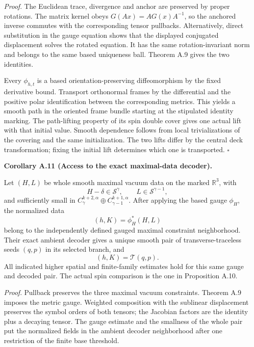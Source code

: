 \documentclass[
  english,
  11pt,
  reqno]{amsart}
\makeatletter
\newcommand{\pandocstatementheading}[1]{%
  \par\if@nobreak\else
    \addpenalty{\@beginparpenalty}%
    \addvspace{.5\baselineskip plus .2\baselineskip minus .2\baselineskip}%
  \fi
  {\normalfont\bfseries #1\par}%
  \nobreak\@afterindenttrue\@afterheading
}
\makeatother
\begin{document}
\emph{Proof.} The Euclidean trace, divergence and anchor are preserved
by proper rotations. The matrix kernel obeys \(G(Ax)=AG(x)A^{-1}\), so
the anchored inverse commutes with the corresponding tensor pullbacks.
Alternatively, direct substitution in the gauge equation shows that the
displayed conjugated displacement solves the rotated equation. It has
the same rotation-invariant norm and belongs to the same based
uniqueness ball. Theorem A.9 gives the two identities.

Every \(\phi_{h,t}\) is a based orientation-preserving diffeomorphism by
the fixed derivative bound. Transport orthonormal frames by the
differential and the positive polar identification between the
corresponding metrics. This yields a smooth path in the oriented frame
bundle starting at the stipulated identity marking. The path-lifting
property of its spin double cover gives one actual lift with that
initial value. Smooth dependence follows from local trivializations of
the covering and the same initialization. The two lifts differ by the
central deck transformation; fixing the initial lift determines which
one is transported. \hfill\(\square\)

\pandocstatementheading{\leavevmode{}\label{cor:online-gauge-whole-data-decoding}Corollary A.11 (Access to the exact maximal-data decoder).}

Let \((H,L)\) be whole smooth maximal vacuum data on the marked
\(\mathbb R^3\), with \[
H-\delta\in\mathscr S^\gamma,
\qquad L\in\mathscr S^{\gamma-1},
\] and sufficiently small in
\(C^{k+2,\alpha}_\gamma\oplus C^{k+1,\alpha}_{\gamma-1}\). After
applying the based gauge \(\phi_H\), the normalized data%
 \[
(h,K)=\phi_H^*(H,L)
\] belong to the independently defined gauged maximal constraint
neighborhood. Their exact ambient decoder gives a unique smooth pair of
transverse-traceless seeds \((q,p)\) in its selected branch, and%
 \[
(h,K)=\mathcal T(q,p).
\] All indicated higher spatial and finite-family estimates hold for
this same gauge and decoded pair. The actual spin comparison is the one
in Proposition A.10.

\emph{Proof.} Pullback preserves the three maximal vacuum constraints.
Theorem A.9 imposes the metric gauge. Weighted composition with the
sublinear displacement preserves the symbol orders of both tensors; the
Jacobian factors are the identity plus a decaying tensor. The gauge
estimate and the smallness of the whole pair put the normalized fields
in the ambient decoder neighborhood after one restriction of the finite
base threshold.
\end{document}
